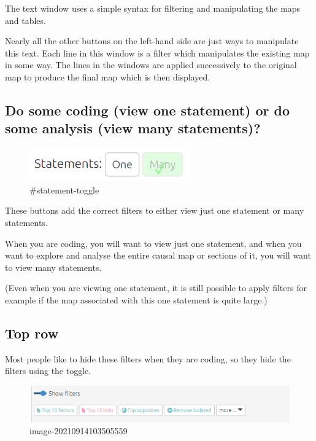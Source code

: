 \documentclass[
]{book}
\begin{document}
The text window uses a simple syntax for filtering and manipulating the maps and tables.

Nearly all the other buttons on the left-hand side are just ways to manipulate this text. Each line in this window is a filter which manipulates the existing map in some way. The lines in the windows are applied successively to the original map to produce the final map which is then displayed.

\hypertarget{xstatement-view}{%
\subsection{Do some coding (view one statement) or do some analysis (view many statements)?}\label{xstatement-view}}

\begin{figure}
\centering
\includegraphics{_assets/image-20211026110623336.png}
\caption{\#statement-toggle}
\end{figure}

These buttons add the correct filters to either view just one statement or many statements.

When you are coding, you will want to view just one statement, and when you want to explore and analyse the entire causal map or sections of it, you will want to view many statements.

(Even when you are viewing one statement, it is still possible to apply filters for example if the map associated with this one statement is quite large.)

\hypertarget{top-row}{%
\subsection{Top row}\label{top-row}}

Most people like to hide these filters when they are coding, so they hide the filters using the toggle.

\begin{figure}
\centering
\includegraphics{_assets/image-20210914103505559.png}
\caption{image-20210914103505559}
\end{figure}
\end{document}
